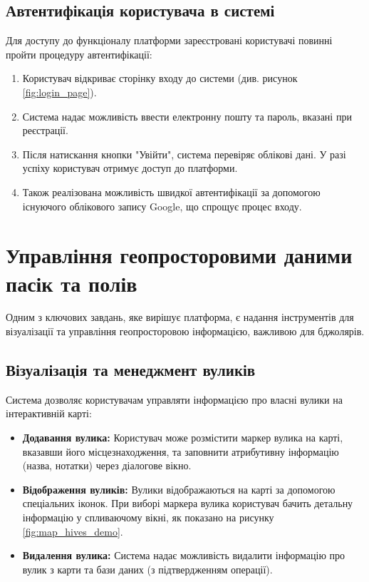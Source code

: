 \subsection{Автентифікація користувача в системі}
\label{subsec:task_login}
Для доступу до функціоналу платформи зареєстровані користувачі повинні пройти процедуру автентифікації:
\begin{enumerate}
    \item Користувач відкриває сторінку входу до системи (див. рисунок \ref{fig:login_page}).
    \item Система надає можливість ввести електронну пошту та пароль, вказані при реєстрації.
    \item Після натискання кнопки "Увійти", система перевіряє облікові дані. У разі успіху користувач отримує доступ до платформи.
    \item Також реалізована можливість швидкої автентифікації за допомогою існуючого облікового запису Google, що спрощує процес входу.
\end{enumerate}


\section{Управління геопросторовими даними пасік та полів}
\label{sec:tasks_map}
Одним з ключових завдань, яке вирішує платформа, є надання інструментів для візуалізації та управління геопросторовою інформацією, важливою для бджолярів.

\subsection{Візуалізація та менеджмент вуликів}
\label{subsec:task_map_hives}
Система дозволяє користувачам управляти інформацією про власні вулики на інтерактивній карті:
\begin{itemize}
    \item \textbf{Додавання вулика:} Користувач може розмістити маркер вулика на карті, вказавши його місцезнаходження, та заповнити атрибутивну інформацію (назва, нотатки) через діалогове вікно.
    \item \textbf{Відображення вуликів:} Вулики відображаються на карті за допомогою спеціальних іконок. При виборі маркера вулика користувач бачить детальну інформацію у спливаючому вікні, як показано на рисунку \ref{fig:map_hives_demo}.
    \item \textbf{Видалення вулика:} Система надає можливість видалити інформацію про вулик з карти та бази даних (з підтвердженням операції).
\end{itemize}


